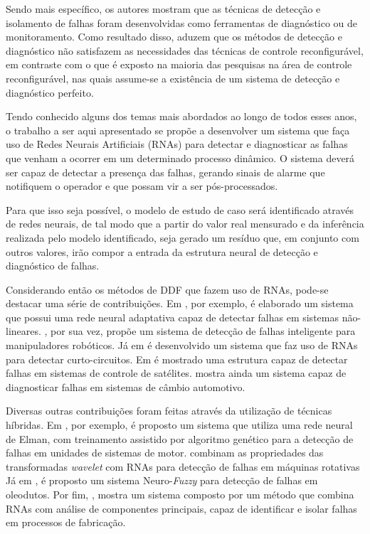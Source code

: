 Sendo mais específico, os autores mostram que as técnicas de detecção e
isolamento de falhas foram desenvolvidas como ferramentas de diagnóstico ou de
monitoramento. Como resultado disso, aduzem que os métodos de detecção e
diagnóstico não satisfazem as necessidades das técnicas de controle
reconfigurável, em contraste com o que é exposto na maioria das pesquisas na
área de controle reconfigurável, nas quais assume-se a existência de um sistema
de detecção e diagnóstico perfeito.

Tendo conhecido alguns dos temas mais abordados ao longo de todos esses anos, o
trabalho a ser aqui apresentado se propõe a desenvolver um sistema que faça uso
de Redes Neurais Artificiais (RNAs) para detectar e diagnosticar as falhas que
venham a ocorrer em um determinado processo dinâmico. O sistema deverá ser capaz
de detectar a presença das falhas, gerando sinais de alarme que notifiquem o
operador e que possam vir a ser pós-processados.


Para que isso seja possível, o modelo de estudo de caso será identificado
através de redes neurais, de tal modo que a partir do valor real mensurado e da
inferência realizada pelo modelo identificado, seja gerado um resíduo que, em
conjunto com outros valores, irão compor a entrada da estrutura neural de
detecção e diagnóstico de falhas.

Considerando então os métodos de DDF que fazem uso de RNAs, pode-se destacar uma
série de contribuições. Em , por exemplo, é elaborado
um sistema que possui uma rede neural adaptativa capaz de detectar falhas em
sistemas não-lineares. , por sua vez, propõe um sistema
de detecção de falhas inteligente para manipuladores robóticos. Já em
 é desenvolvido um sistema que faz uso de RNAs para
detectar curto-circuitos. Em  é mostrado uma estrutura
capaz de detectar falhas em sistemas de controle de satélites.
 mostra ainda um sistema capaz de diagnosticar falhas em
sistemas de câmbio automotivo.

Diversas outras contribuições foram feitas através da utilização de técnicas
híbridas. Em , por exemplo, é proposto um sistema que
utiliza uma rede neural de Elman, com treinamento assistido por algoritmo
genético para a detecção de falhas em unidades de sistemas de motor.
 combinam as propriedades das transformadas {\it wavelet}
com RNAs para detecção de falhas em máquinas rotativas Já em
, é proposto um sistema Neuro-{\it Fuzzy} para detecção de
falhas em oleodutos. Por fim, , mostra um sistema
composto por um método que combina RNAs com análise de componentes principais,
capaz de identificar e isolar falhas em processos de fabricação.

